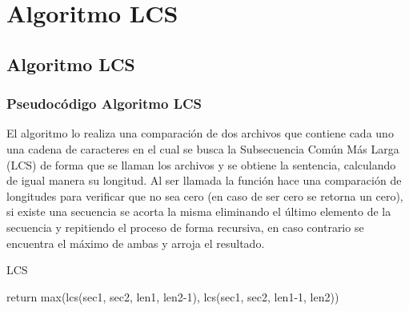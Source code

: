     
    
    
\newpage
\section{Algoritmo LCS}
    \subsection{Algoritmo LCS}
   
    \subsubsection{Pseudocódigo Algoritmo LCS}
    El algoritmo lo realiza una comparación de dos archivos que contiene cada uno una cadena de caracteres en el cual se busca la Subsecuencia Común Más Larga (LCS) de forma que se llaman los archivos y se obtiene la sentencia, calculando de igual manera su longitud. Al ser llamada la función hace una comparación de longitudes para verificar que no sea cero (en caso de ser cero se retorna un cero), si existe una secuencia se acorta la misma eliminando el último elemento de la secuencia y repitiendo el proceso de forma recursiva, en caso contrario se encuentra el máximo de ambas y arroja el resultado.
        \begin{algorithm}
            \caption{LCS
            }\label{alg:two}
            
                { 
                    { 
                        return max(lcs(sec1, sec2, len1, len2-1), lcs(sec1, sec2, len1-1, len2))\;
                    }
                }
                        

            
        \end{algorithm}
        
        
        
        